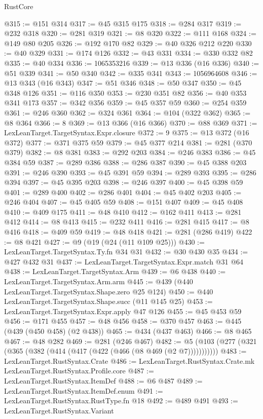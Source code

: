 \begin{lexlean}{RustCore}
\begin{coremodule}
@315 := @151 @314
@317 := @45 @315 @175
@318 := @284 @317
@319 := @232 @318
@320 := @281 @319
@321 := @8 @320
@322 := @111 @168
@324 := @149 @80 @205
@326 := @192 @170 @82
@329 := @40 @326 @212 @220
@330 := @40 @329
@331 := @174 @126
@332 := @43 @331
@334 := @330 @332 @82
@335 := @40 @334
@336 := 1065353216
@339 := @13 @336 (@16 @336)
@340 := @51 @339
@341 := @50 @340
@342 := @335 @341
@343 := 1056964608
@346 := @13 @343 (@16 @343)
@347 := @51 @346
@348 := @50 @347
@350 := @45 @348 @126
@351 := @116 @350
@353 := @230 @351 @82
@356 := @40 @353 @341 @173
@357 := @342 @356
@359 := @45 @357 @59
@360 := @254 @359
@361 := @246 @360
@362 := @324 @361
@364 := @104 (@322 @362)
@365 := @8 @364
@366 := 8
@369 := @13 @366 (@16 @366)
@370 := @88 @369
@371 := LexLeanTarget.TargetSyntax.Expr.closure
@372 := 9
@375 := @13 @372 (@16 @372)
@377 := @371 @375 @59
@379 := @45 @377 @214
@381 := @281 (@370 @379)
@382 := @8 @381
@383 := @292 @203
@384 := @246 @383
@386 := @45 @384 @59
@387 := @289 @386
@388 := @286 @387
@390 := @45 @388 @203
@391 := @246 @390
@393 := @45 @391 @59
@394 := @289 @393
@395 := @286 @394
@397 := @45 @395 @203
@398 := @246 @397
@400 := @45 @398 @59
@401 := @289 @400
@402 := @286 @401
@404 := @45 @402 @203
@405 := @246 @404
@407 := @45 @405 @59
@408 := @151 @407
@409 := @45 @408
@410 := @409 @175
@411 := @48 @410
@412 := @162 @411
@413 := @281 @412
@414 := @8 @413
@415 := @232 @411
@416 := @281 @415
@417 := @8 @416
@418 := @409 @59
@419 := @48 @418
@421 := @281 (@286 @419)
@422 := @8 @421
@427 := @9 (@19 (@24 (@11 @109 @25)))
@430 := LexLeanTarget.TargetSyntax.Ty.fn @34 @31
@432 := @30 @430 @35
@434 := @427 @432 @31
@437 := LexLeanTarget.TargetSyntax.Expr.match @31 @64
@438 := LexLeanTarget.TargetSyntax.Arm
@439 := @6 @438
@440 := LexLeanTarget.TargetSyntax.Arm.arm
@445 := @439 (@440 LexLeanTarget.TargetSyntax.Shape.zero @25 @124)
@450 := @440 LexLeanTarget.TargetSyntax.Shape.succ (@11 @145 @25)
@453 := LexLeanTarget.TargetSyntax.Expr.apply @47 @126
@455 := @45 @453 @59
@456 := @171 @455
@457 := @48 @456
@458 := @370 @457
@463 := @445 (@439 (@450 @458) (@2 @438))
@465 := @434 (@437 @463)
@466 := @8 @465
@467 := @48 @282
@469 := @281 (@246 @467)
@482 := @5 (@103 (@277 (@321 (@365 (@382 (@414 (@417 (@422 (@466 (@8 @469 (@2 @7)))))))))))
@483 := LexLeanTarget.RustSyntax.Crate
@486 := LexLeanTarget.RustSyntax.Crate.mk LexLeanTarget.RustSyntax.Profile.core
@487 := LexLeanTarget.RustSyntax.ItemDef
@488 := @6 @487
@489 := LexLeanTarget.RustSyntax.ItemDef.enum
@491 := LexLeanTarget.RustSyntax.RustType.fn @18
@492 := @489 @491
@493 := LexLeanTarget.RustSyntax.Variant

\end{coremodule}
\end{lexlean}
